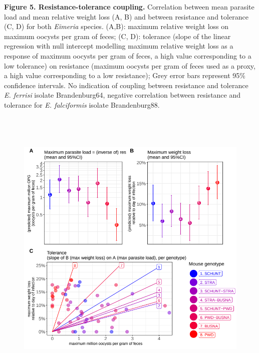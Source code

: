\documentclass[12pt]{article}
\renewcommand{\_}{\kern-1.5pt\textunderscore\kern-1.5pt}
\begin{document}

\par

{\fontsize{10pt}{12.0pt}\selectfont \textbf{\textcolor[HTML]{FF0000}{Figure 5. Resistance-tolerance coupling.}}\textcolor[HTML]{FF0000}{ Correlation between mean parasite load and mean relative weight loss (A, B) and between resistance and tolerance (C, D) for both \textit{Eimeria} species. (A,B): maximum relative weight loss on maximum oocysts per gram of feces; (C, D):\textbf{ }tolerance (slope of the linear regression with null intercept modelling maximum relative weight loss as a response of maximum oocysts per gram of feces, a high value corresponding to a low tolerance) on resistance (maximum oocysts per gram of feces used as a proxy, a high value corresponding to a low resistance); Grey error bars represent 95$\%$  confidence intervals. No indication of coupling between resistance and tolerance \textit{E. ferrisi }isolate Brandenburg64, negative correlation between resistance and tolerance for \textit{E. falciformis }isolate Brandenburg88. }\par}


\newpage
\par


\vspace{\baselineskip}



\begin{figure}[H]
	\begin{Center}
		\includegraphics[width=5.74in,height=5.46in]{./media/image8.png}
	\end{Center}
\end{figure}
\end{document}
